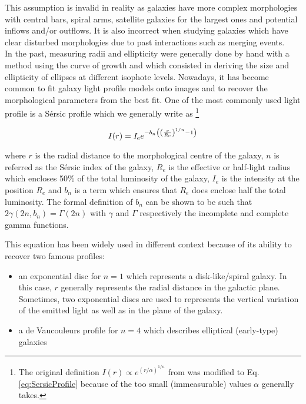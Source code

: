 This assumption is invalid in reality as galaxies have more complex morphologies with central bars, spiral arms, satellite galaxies for the largest ones and potential inflows and/or outflows. It is also incorrect when studying galaxies which have clear disturbed morphologies due to past interactions such as merging events.  \\

In the past, measuring radii and ellipticity were generally done by hand with a method using the curve of growth and which consisted in deriving the size and ellipticity of ellipses at different isophote levels. Nowadays, it has become common to fit galaxy light profile models onto images and to recover the morphological parameters from the best fit. One of the most commonly used light profile is a Sérsic profile which we generally write as \footnote{The original definition $I(r) \propto e^{(r/\alpha)^{1/n}}$ from  was modified to Eq.\,\ref{eq:SersicProfile} because of the too small (immeasurable) values $\alpha$ generally takes.} 

\begin{equation}
    \label{eq:SersicProfile}
    I(r) = I_{\rm{e}} e^{ - b_n \left ( \left  ( \frac{r}{R_{\rm{e}}}  \right )^{1/n} - 1 \right ) }
\end{equation}

where $r$ is the radial distance to the morphological centre of the galaxy, $n$ is referred as the Sérsic index of the galaxy, $R_e$ is the effective or half-light radius which encloses 50\% of the total luminosity of the galaxy, $I_e$ is the intensity at the position $R_e$ and $b_n$ is a term which ensures that $R_e$ does enclose half the total luminosity. The formal definition of $b_n$ can be shown to be such that $2 \gamma (2n, b_n) = \Gamma (2n)$ with $\gamma$ and $\Gamma$ respectively the incomplete and complete gamma functions.

This equation has been widely used in different context because of its ability to recover two famous profiles:

\begin{itemize}
    \item an exponential disc for $n = 1$ which represents a disk-like/spiral galaxy. In this case, $r$ generally represents the radial distance in the galactic plane. Sometimes, two exponential discs are used to represents the vertical variation of the emitted light as well as in the plane of the galaxy. 
    \item a de Vaucouleurs profile for $n = 4$ which describes elliptical (early-type) galaxies
\end{itemize}

